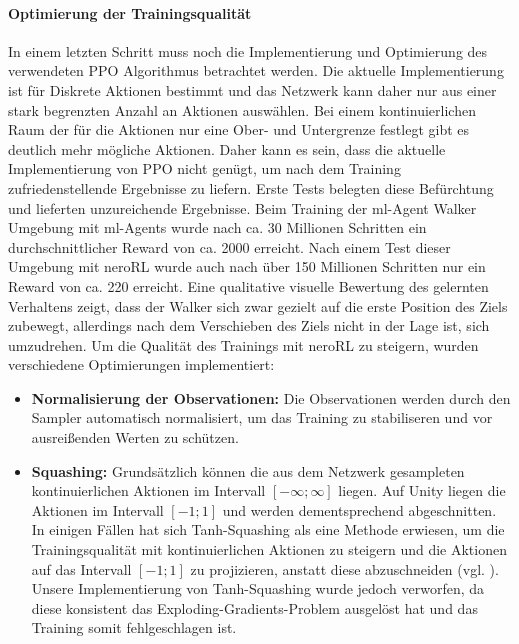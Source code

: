 \paragraph{Optimierung der Trainingsqualität} \fup
\noindent In einem letzten Schritt muss noch die Implementierung und Optimierung des verwendeten PPO Algorithmus betrachtet werden. Die aktuelle Implementierung ist für Diskrete Aktionen bestimmt und das Netzwerk kann daher nur aus einer stark begrenzten Anzahl an Aktionen auswählen. Bei einem kontinuierlichen Raum der für die Aktionen nur eine Ober- und Untergrenze festlegt gibt es deutlich mehr mögliche Aktionen. Daher kann es sein, dass die aktuelle Implementierung von PPO nicht genügt, um nach dem Training zufriedenstellende Ergebnisse zu liefern. Erste Tests belegten diese Befürchtung und lieferten unzureichende Ergebnisse. Beim Training der ml-Agent Walker Umgebung mit ml-Agents wurde nach ca. 30 Millionen Schritten ein durchschnittlicher Reward von ca. 2000 erreicht. Nach einem Test dieser Umgebung mit neroRL wurde auch nach über 150 Millionen Schritten nur ein Reward von ca. 220 erreicht.
Eine qualitative visuelle Bewertung des gelernten Verhaltens zeigt, dass der Walker sich zwar gezielt auf die erste Position des Ziels zubewegt, allerdings nach dem Verschieben des Ziels nicht in der Lage ist, sich umzudrehen. 
Um die Qualität des Trainings mit neroRL zu steigern, wurden verschiedene Optimierungen implementiert:

\begin{itemize}
	\item \textbf{Normalisierung der Observationen:} Die Observationen werden durch den Sampler automatisch normalisiert, um das Training zu stabiliseren und vor ausreißenden Werten zu schützen.
	\item \textbf{Squashing:} Grundsätzlich können die aus dem Netzwerk gesampleten kontinuierlichen Aktionen im Intervall $[-\infty;\infty]$ liegen. Auf Unity liegen die Aktionen im Intervall $[-1;1]$ und werden dementsprechend abgeschnitten. In einigen Fällen hat sich Tanh-Squashing als eine Methode erwiesen, um die Trainingsqualität mit kontinuierlichen Aktionen zu steigern und die Aktionen auf das Intervall $[-1;1]$ zu projizieren, anstatt diese abzuschneiden (vgl. \cite{shengyi2022the37implementation}). Unsere Implementierung von Tanh-Squashing wurde jedoch verworfen, da diese konsistent das Exploding-Gradients-Problem ausgelöst hat und das Training somit fehlgeschlagen ist. 
\end{itemize}

